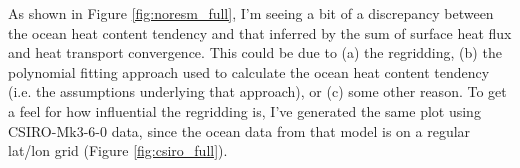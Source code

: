 As shown in Figure \ref{fig:noresm_full}, I'm seeing a bit of a discrepancy between the ocean heat content tendency and that inferred by the sum of surface heat flux and heat transport convergence. This could be due to (a) the regridding, (b) the polynomial fitting approach used to calculate the ocean heat content tendency (i.e. the assumptions underlying that approach), or (c) some other reason. To get a feel for how influential the regridding is, I've generated the same plot using CSIRO-Mk3-6-0 data, since the ocean data from that model is on a regular lat/lon grid (Figure \ref{fig:csiro_full}). 